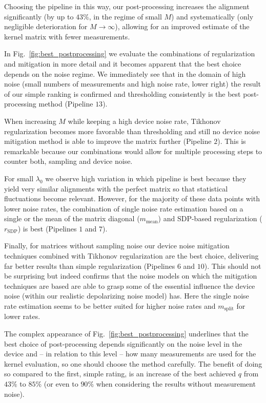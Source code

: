 \documentclass[twocolumn,superscriptaddress,nofootinbib]{revtex4-2}
\begin{document}
Choosing the pipeline in this way, our post-processing increases the alignment significantly (by up to $43\%$, in the regime of small $M$) and systematically (only negligible deterioration for $M\to\infty$), allowing for an improved estimate of the kernel matrix with fewer measurements.

In Fig.~\ref{fig:best_postprocessing} we evaluate the combinations of regularization and mitigation in more detail and it becomes apparent that the best choice depends on the noise regime.
We immediately see that in the domain of high noise (small numbers of measurements and high noise rate, lower right) the result of our simple ranking is confirmed and thresholding consistently is the best post-processing method (Pipeline $13$).

When increasing $M$ while keeping a high device noise rate, Tikhonov regularization becomes more favorable than thresholding and still no device noise mitigation method is able to improve the matrix further (Pipeline $2$).
This is remarkable because our combinations would allow for multiple processing steps to counter both, sampling and device noise.

For small $\lambda_0$ we observe high variation in which pipeline is best because they yield very similar alignments with the perfect matrix so that statistical fluctuations become relevant.
However, for the majority of these data points with lower noise rates, the combination of single noise rate estimation based on a single or the mean of the matrix diagonal ($m_\mathrm{mean}$) and SDP-based regularization ($r_\mathrm{SDP}$) is best (Pipelines $1$ and $7$).

Finally, for matrices without sampling noise our device noise mitigation techniques combined with Tikhonov regularization are the best choice, delivering far better results than simple regularization (Pipelines $6$ and $10$).
This should not be surprising but indeed confirms that the noise models on which the mitigation techniques are based are able to grasp some of the essential influence the device noise (within our realistic depolarizing noise model) has.
Here the single noise rate estimation seems to be better suited for higher noise rates and $m_\mathrm{split}$ for lower rates.

The complex appearance of Fig.~\ref{fig:best_postprocessing} underlines that the best choice of post-processing depends significantly on the noise level in the device and -- in relation to this level -- how many measurements are used for the kernel evaluation, so one should choose the method carefully.
The benefit of doing so compared to the first, simple rating, is an increase of the best achieved $q$ from $43\%$ to $85\%$ (or even to $90\%$ when considering the results without measurement noise).
\end{document}
